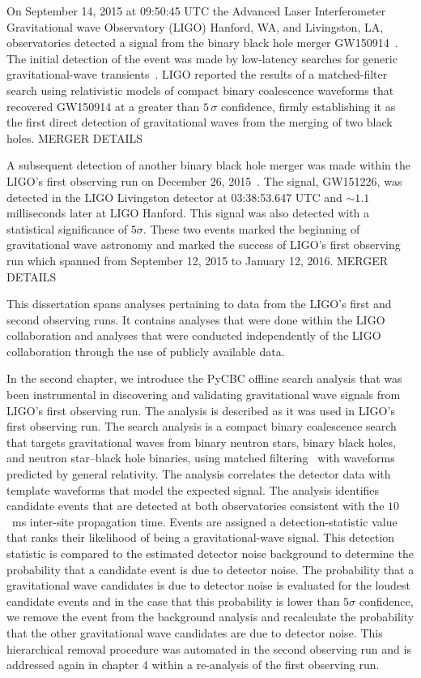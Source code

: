 On September 14, 2015 at 09:50:45 UTC the Advanced Laser Interferometer Gravitational wave Observatory (LIGO) Hanford, WA, and Livingston, LA, observatories detected a signal from the binary black hole merger GW150914~\cite{GW150914-DETECTION}. The initial detection of the event was made by low-latency searches for generic gravitational-wave transients~\cite{GW150914-BURST}. LIGO reported the results of a matched-filter search using relativistic models of compact binary coalescence waveforms that recovered GW150914 at a greater than $5 \, \sigma$ confidence, firmly establishing it as the first direct detection of gravitational waves from the merging of two black holes.
MERGER DETAILS


A subsequent detection of another binary black hole merger was made within the LIGO's first observing run on December 26, 2015~\cite{}. The signal, GW151226, was detected in the LIGO Livingston detector at 03:38:53.647 UTC and $\sim 1.1$ milliseconds later at LIGO Hanford. This signal was also detected with a statistical significance of $5 \sigma$. These two events marked the beginning of gravitational wave astronomy and marked the success of LIGO's first observing run which spanned from September 12, 2015 to January 12, 2016. MERGER DETAILS

This dissertation spans analyses pertaining to data from the LIGO's first and second observing runs. It contains analyses that were done within the LIGO collaboration and analyses that were conducted independently of the LIGO collaboration through the use of publicly available data.

In the second chapter, we introduce the PyCBC offline search analysis that was been instrumental in discovering and validating gravitational wave signals from LIGO's first observing run. The analysis is described as it was used in LIGO's first observing run. The \pycbc{} search analysis is a compact binary coalescence search~\cite{thorne.k:1987,Sathyaprakash:1991mt,Cutler:1992tc,Finn:1992wt,Finn:1992xs,Dhurandhar:1992mw,Balasubramanian:1995bm,Flanagan:1997sx} that targets gravitational waves from binary neutron stars, binary black holes, and neutron star--black hole binaries, using matched filtering~\cite{wainstein:1962} with waveforms predicted by general relativity.  The \pycbc{} analysis correlates the detector data with template waveforms that model the expected signal. The analysis identifies candidate events that are detected at both observatories consistent with the $10$~ms inter-site propagation time. Events are assigned a detection-statistic value that ranks their likelihood of being a gravitational-wave signal. This detection statistic is compared to the estimated detector noise background to determine the probability that a candidate event is due to detector noise. The probability that a gravitational wave candidates is due to detector noise is evaluated for the loudest candidate events and in the case that this probability is lower than $5 \sigma$ confidence, we remove the event from the background analysis and recalculate the probability that the other gravitational wave candidates are due to detector noise. This hierarchical removal procedure was automated in the second observing run and is addressed again in chapter 4 within a re-analysis of the first observing run.

